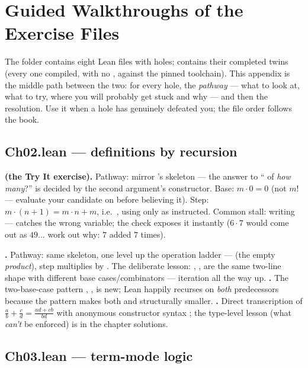 \chapter{Guided Walkthroughs of the Exercise Files}
\label{app:walkthroughs}

The  folder contains eight Lean files with 
holes;  contains their completed twins (every one
compiled, with no , against the pinned toolchain). This
appendix is the middle path between the two: for every hole, the
\emph{pathway} --- what to look at, what to try, where you will
probably get stuck and why --- and then the resolution. Use it when a
hole has genuinely defeated you; the file order follows the book.

\section{Ch02.lean --- definitions by recursion}

\textbf{ (the Try It exercise).} Pathway: mirror 's
skeleton --- the answer to `` of \emph{how many}?'' is
decided by the second argument's constructor. Base:
$m \cdot 0 = 0$ (not $m$! --- evaluate your candidate on
 before believing it). Step: $m \cdot (n+1) = m \cdot n +
m$, i.e.\ , using only \lean{+} as instructed.
Common stall: writing  --- catches the wrong
variable; the check  exposes it instantly
($6 \cdot 7$ would come out as $49$... work out why: $7$ added $7$
times).

\textbf{.} Pathway: same skeleton, one level up the operation
ladder ---  (the empty \emph{product}), step
multiplies by . The deliberate lesson: , ,
 are the same two-line shape with different base
cases/combinators --- iteration all the way up. \textbf{.}
The two-base-case pattern , ,  is
new; Lean happily recurses on \emph{both} predecessors because the
pattern  makes both  and  structurally
smaller. \textbf{.} Direct transcription of
$\frac{a}{b} + \frac{c}{d} = \frac{ad + cb}{bd}$ with anonymous
constructor syntax ; the type-level lesson (what
\emph{can't} be enforced) is in the chapter solutions.

\section{Ch03.lean --- term-mode logic}

